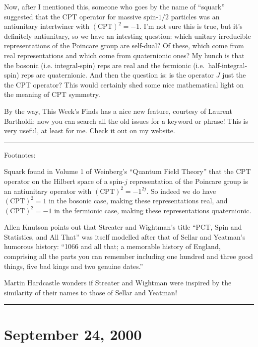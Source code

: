 \documentclass{article}
\begin{document}
Now, after I mentioned this, someone who goes by the name of ``squark''
suggested that the CPT operator for massive spin-\(1/2\) particles was
an antiunitary intertwiner with \((\mathrm{CPT})^2 = -1\). I'm not sure
this is true, but it's definitely antiunitary, so we have an intesting
question: which unitary irreducible representations of the Poincare
group are self-dual? Of these, which come from real representations and
which come from quaternionic ones? My hunch is that the bosonic (i.e.
integral-spin) reps are real and the fermionic (i.e.~half-integral-spin)
reps are quaternionic. And then the question is: is the operator \(J\)
just the the CPT operator? This would certainly shed some nice
mathematical light on the meaning of CPT symmetry.

By the way, This Week's Finds has a nice new feature, courtesy of
Laurent Bartholdi: now you can search all the old issues for a keyword
or phrase! This is very useful, at least for me. Check it out on my
website.

\begin{center}\rule{0.5\linewidth}{0.5pt}\end{center}

Footnotes:

Squark found in Volume 1 of Weinberg's ``Quantum Field Theory'' that the
CPT operator on the Hilbert space of a spin-\(j\) representation of the
Poincare group is an antiunitary operator with
\((\mathrm{CPT})^2 = -1^{2j}\). So indeed we do have
\((\mathrm{CPT})^2 = 1\) in the bosonic case, making these
representations real, and \((\mathrm{CPT})^2 = -1\) in the fermionic
case, making these representations quaternionic.

Allen Knutson points out that Streater and Wightman's title ``PCT, Spin
and Statistics, and All That'' was itself modelled after that of Sellar
and Yeatman's humorous history: ``1066 and all that; a memorable history
of England, comprising all the parts you can remember including one
hundred and three good things, five bad kings and two genuine dates.''

Martin Hardcastle wonders if Streater and Wightman were inspired by the
similarity of their names to those of Sellar and Yeatman!

\begin{center}\rule{0.5\linewidth}{0.5pt}\end{center}



\hypertarget{week157}{%
\section{September 24, 2000}\label{week157}}
\end{document}
